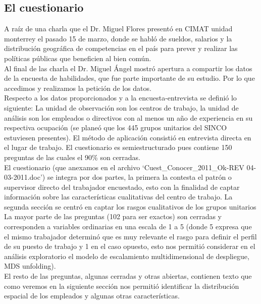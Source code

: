 \documentclass[paper=letter, fontsize=11pt]{scrartcl}
\numberwithin{equation}{section} %
\numberwithin{figure}{section} %
\numberwithin{table}{section} %
\begin{document}
\subsection{El cuestionario }

A raíz de una charla que el Dr. Miguel Flores presentó en CIMAT unidad monterrey el pasado 15 de marzo, donde se habló de sueldos, salarios y la distribución geográfica de competencias en el país para prever y realizar las políticas públicas que beneficien al bien común. \\

Al final de las charla el Dr. Miguel Ángel mostró apertura a compartir los datos de la encuesta de habilidades, que fue parte importante de su estudio. Por lo que accedimos y realizamos la petición de los datos.   \\

Respecto a los datos proporcionados y a la encuesta-entrevista se definió lo siguiente: La unidad de observación son los centros de trabajo, la unidad de análisis son los empleados o directivos con al menos un año de experiencia en su respectiva ocupación (se planeó que los 445 grupos unitarios del SINCO estuviesen presentes). El método de aplicación consistió en entrevista directa en el lugar de trabajo. El cuestionario es semiestructurado pues contiene 150 preguntas de las cuales el 90\% son cerradas. \\

El cuestionario (que anexamos en el archivo ‘Cuest\_Conocer\_2011\_Ok-REV 04-03-2011.doc’) se integra por dos partes, la primera la contesta el patrón o supervisor directo del trabajador encuestado, esto con la finalidad de captar información sobre las características cualitativas del centro de trabajo. La segunda sección se centró en captar los rasgos cualitativos de los grupos unitarios  \\

La mayor parte de las preguntas (102 para ser exactos) son cerradas y corresponden a variables ordinarias en una escala de 1 a 5 (donde 5 expresa que 	 	 	
el mismo trabajador determinó que es muy relevante el rasgo para definir el perfil de su puesto de trabajo  y 1 en el caso opuesto, esto nos permitió considerar en el análisis exploratorio el modelo de escalamiento multidimensional de despliegue, MDS unfolding).\\

El resto de las preguntas, algunas cerradas y otras abiertas, contienen texto que como veremos en la siguiente sección nos permitió identificar la distribución espacial de los empleados y algunas otras características. \\
\end{document}
